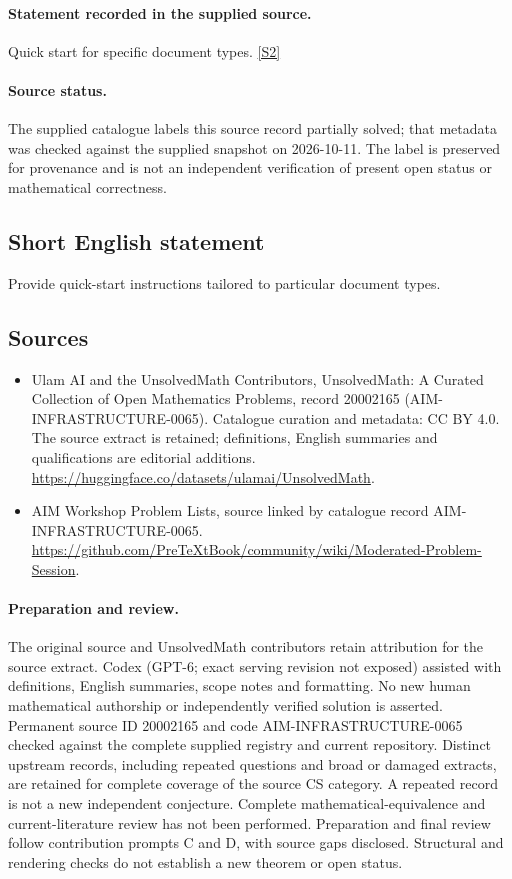 \documentclass[11pt]{article}
\begin{document}
\paragraph{Statement recorded in the supplied source.}
Quick start for specific document types. \href{https://github.com/PreTeXtBook/community/wiki/Moderated-Problem-Session}{[S2]}
\paragraph{Source status.}
The supplied catalogue labels this source record partially solved; that metadata was checked against the supplied snapshot on 2026-10-11. The label is preserved for provenance and is not an independent verification of present open status or mathematical correctness.
\subsection{Short English statement}
Provide quick-start instructions tailored to particular document types.
\subsection{Sources}
\begin{itemize}
\item[S1] Ulam AI and the UnsolvedMath Contributors, UnsolvedMath: A Curated Collection of Open Mathematics Problems, record 20002165 (AIM-INFRASTRUCTURE-0065). Catalogue curation and metadata: CC BY 4.0. The source extract is retained; definitions, English summaries and qualifications are editorial additions.
\url{https://huggingface.co/datasets/ulamai/UnsolvedMath}.
\item[S2] AIM Workshop Problem Lists, source linked by catalogue record AIM-INFRASTRUCTURE-0065.
\url{https://github.com/PreTeXtBook/community/wiki/Moderated-Problem-Session}.
\end{itemize}
\paragraph{Preparation and review.}
The original source and UnsolvedMath contributors retain attribution for the source extract. Codex (GPT-6; exact serving revision not exposed) assisted with definitions, English summaries, scope notes and formatting. No new human mathematical authorship or independently verified solution is asserted. Permanent source ID 20002165 and code AIM-INFRASTRUCTURE-0065 checked against the complete supplied registry and current repository. Distinct upstream records, including repeated questions and broad or damaged extracts, are retained for complete coverage of the source CS category. A repeated record is not a new independent conjecture. Complete mathematical-equivalence and current-literature review has not been performed. Preparation and final review follow contribution prompts C and D, with source gaps disclosed. Structural and rendering checks do not establish a new theorem or open status.
\label{end:20002165}
\end{document}
